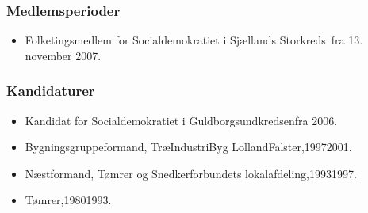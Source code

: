 \documentclass[11pt, a4paper]{awesome-cv}
\begin{document}
\begin{cvletter}
\subsubsection*{Medlemsperioder}
\begin{itemize}
\item Folketingsmedlem for Socialdemokratiet i Sjællands Storkreds fra 13. november 2007.
\end{itemize}
\subsubsection*{Kandidaturer}
\begin{itemize}
\item Kandidat for Socialdemokratiet i Guldborgsundkredsenfra 2006.
\end{itemize}
\begin{itemize}
\item Bygningsgruppeformand, TræIndustriByg LollandFalster,19972001.
\item Næstformand, Tømrer og Snedkerforbundets lokalafdeling,19931997.
\item Tømrer,19801993.
\end{itemize}
\end{cvletter}
\end{document}
